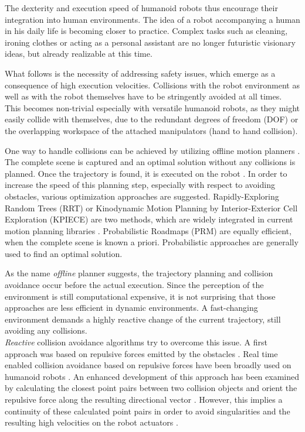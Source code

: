 The dexterity and execution speed of humanoid robots thus encourage their integration into human environments. The idea of a robot accompanying a human in his daily life is becoming closer to practice. Complex tasks such as cleaning, ironing clothes or acting as a personal assistant are no longer futuristic visionary ideas, but already realizable at this time. 

What follows is the necessity of addressing safety issues, which emerge as a consequence of high execution velocities. Collisions with the robot environment as well as with the robot themselves have to be stringently avoided at all times. This becomes non-trivial especially with versatile humanoid robots, as they might easily collide with themselves, due to the redundant degrees of freedom (DOF) or the overlapping workspace of the attached manipulators (hand to hand collision). 

One way to handle collisions can be achieved by utilizing offline motion planners \cite{LaValle04planningalgorithms}. The complete scene is captured and an optimal solution without any collisions is planned. Once the trajectory is found, it is executed on the robot \cite{conf/iros/LiuDZ05}. In order to increase the speed of this planning step, especially with respect to avoiding obstacles, various optimization approaches are suggested. Rapidly-Exploring Random Trees (RRT) \cite{Lavalle98rapidly-exploringrandom} or Kinodynamic Motion Planning by Interior-Exterior Cell Exploration (KPIECE) \cite{644} are two methods, which are widely integrated in current motion planning libraries \cite{ompl}. Probabilistic Roadmaps (PRM) \cite{Kavraki96probabilisticroadmaps} are equally efficient, when the complete scene is known a priori. Probabilistic approaches \cite{Thrunprobabilisticalgorithms} are generally used to find an optimal solution. 

As the name \textit{offline} planner suggests, the trajectory planning and collision avoidance occur before the actual execution. Since the perception of the environment is still computational expensive, it is not surprising that those approaches are less efficient in dynamic environments. A fast-changing environment demands a highly reactive change of the current trajectory, still avoiding any collisions. \\
\textit{Reactive} collision avoidance algorithms try to overcome this issue. A first approach was based on repulsive forces emitted by the obstacles \cite{Khatib:86g}. Real time enabled collision avoidance based on repulsive forces have been broadly used on humanoid robots \cite{conf/humanoids/SugiuraGJG06} \cite{Xie98real-timecollision}  \cite{conf/iros/SetoKH05}. 
An enhanced development of this approach has been examined by calculating the closest point pairs between two collision objects and orient the repulsive force along the resulting directional vector \cite{conf/icra/DietrichWTAH11}. However, this implies a continuity of these calculated point pairs in order to avoid singularities and the resulting high velocities on the robot actuators \cite{escande:itro:2013}.


